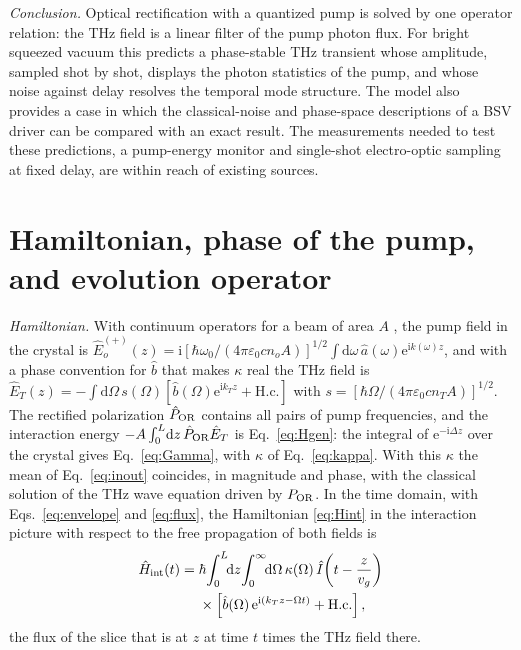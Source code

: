 \documentclass[aps,pra,reprint,superscriptaddress,amsmath,amssymb,floatfix]{revtex4-2}
\newcommand{\Iop}{\hat I}
\newcommand{\dd}{\mathrm{d}}
\newcommand{\ee}{\mathrm{e}}
\newcommand{\ii}{\mathrm{i}}
\begin{document}
\emph{Conclusion.} Optical rectification with a quantized pump is solved by
one operator relation: the THz field is a linear filter of the pump photon
flux. For bright squeezed vacuum this predicts a phase-stable THz transient
whose amplitude, sampled shot by shot, displays the photon statistics of the
pump, and whose noise against delay resolves the temporal mode structure. The
model also provides a case in which the classical-noise and phase-space
descriptions of a BSV driver can be compared with an exact result. The
measurements needed to test these predictions, a pump-energy monitor and
single-shot electro-optic sampling at fixed delay, are within reach of
existing sources.

\begin{acknowledgments}
[To be completed.]
\end{acknowledgments}

\appendix

\section{Hamiltonian, phase of the pump, and evolution operator}
\label{app:magnus}

\emph{Hamiltonian.} With continuum operators for a beam of area $A$
\cite{blow1990}, the pump field in the crystal is
$\hat E_o^{(+)}(z)=\ii[\hbar\omega_0/(4\pi\varepsilon_0cn_oA)]^{1/2}
\int\!\dd\omega\,\hat a(\omega)\ee^{\ii k(\omega)z}$, and with a phase
convention for $\hat b$ that makes $\kappa$ real the THz field is
$\hat E_T(z)=-\int\!\dd\Omega\,s(\Omega)[\hat b(\Omega)\ee^{\ii k_Tz}
+\mathrm{H.c.}]$ with $s=[\hbar\Omega/(4\pi\varepsilon_0cn_TA)]^{1/2}$. The
rectified polarization $\hat P_{\rm OR}$ contains all pairs of pump
frequencies, and the interaction energy
$-A\int_0^L\!\dd z\,\hat P_{\rm OR}\hat E_T$ is Eq.~\eqref{eq:Hgen}: the
integral of $\ee^{-\ii\Delta z}$ over the crystal gives
Eq.~\eqref{eq:Gamma}, with $\kappa$ of Eq.~\eqref{eq:kappa}. With this
$\kappa$ the mean of Eq.~\eqref{eq:inout} coincides, in magnitude and phase,
with the classical solution of the THz wave equation driven by $P_{\rm OR}$.
In the time domain, with Eqs.~\eqref{eq:envelope} and \eqref{eq:flux}, the
Hamiltonian \eqref{eq:Hint} in the interaction picture with respect to the
free propagation of both fields is
\begin{align}
\hat H_{\rm int}(t)={}&\hbar\!\int_0^L\!\!\dd z\!\int_0^\infty\!\!\dd\Omega\,
\kappa(\Omega)\,\Iop\!\left(t-\frac{z}{v_g}\right)\nonumber\\
&\times\left[\hat b(\Omega)\,\ee^{\ii(k_Tz-\Omega t)}+\mathrm{H.c.}\right],
\label{eq:Htime}
\end{align}
the flux of the slice that is at $z$ at time $t$ times the THz field there.
\end{document}
